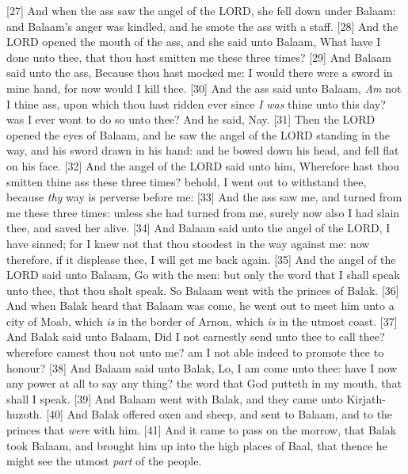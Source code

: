 [27] \textcolor[cmyk]{0.99998,1,0,0}{And when the ass saw the angel of the LORD, she fell down under Balaam: and Balaam's anger was kindled, and he smote the ass with a staff.}
[28] \textcolor[cmyk]{0.99998,1,0,0}{And the LORD opened the mouth of the ass, and she said unto Balaam, What have I done unto thee, that thou hast smitten me these three times?}
[29] \textcolor[cmyk]{0.99998,1,0,0}{And Balaam said unto the ass, Because thou hast mocked me: I would there were a sword in mine hand, for now would I kill thee.}
[30] \textcolor[cmyk]{0.99998,1,0,0}{And the ass said unto Balaam, \emph{Am} not I thine ass, upon which thou hast ridden ever since \emph{I} \emph{was} thine unto this day? was I ever wont to do so unto thee? And he said, Nay.}
[31] \textcolor[cmyk]{0.99998,1,0,0}{Then the LORD opened the eyes of Balaam, and he saw the angel of the LORD standing in the way, and his sword drawn in his hand: and he bowed down his head, and fell flat on his face.}
[32] \textcolor[cmyk]{0.99998,1,0,0}{And the angel of the LORD said unto him, Wherefore hast thou smitten thine ass these three times? behold, I went out to withstand thee, because \emph{thy} way is perverse before me:}
[33] \textcolor[cmyk]{0.99998,1,0,0}{And the ass saw me, and turned from me these three times: unless she had turned from me, surely now also I had slain thee, and saved her alive.}
[34] \textcolor[cmyk]{0.99998,1,0,0}{And Balaam said unto the angel of the LORD, I have sinned; for I knew not that thou stoodest in the way against me: now therefore, if it displease thee, I will get me back again.}
[35] \textcolor[cmyk]{0.99998,1,0,0}{And the angel of the LORD said unto Balaam, Go with the men: but only the word that I shall speak unto thee, that thou shalt speak. So Balaam went with the princes of Balak.}
[36] \textcolor[cmyk]{0.99998,1,0,0}{And when Balak heard that Balaam was come, he went out to meet him unto a city of Moab, which \emph{is} in the border of Arnon, which \emph{is} in the utmost coast.}
[37] \textcolor[cmyk]{0.99998,1,0,0}{And Balak said unto Balaam, Did I not earnestly send unto thee to call thee? wherefore camest thou not unto me? am I not able indeed to promote thee to honour?}
[38] \textcolor[cmyk]{0.99998,1,0,0}{And Balaam said unto Balak, Lo, I am come unto thee: have I now any power at all to say any thing? the word that God putteth in my mouth, that shall I speak.}
[39] \textcolor[cmyk]{0.99998,1,0,0}{And Balaam went with Balak, and they came unto Kirjath-huzoth.}
[40] \textcolor[cmyk]{0.99998,1,0,0}{And Balak offered oxen and sheep, and sent to Balaam, and to the princes that \emph{were} with him.}
[41] \textcolor[cmyk]{0.99998,1,0,0}{And it came to pass on the morrow, that Balak took Balaam, and brought him up into the high places of Baal, that thence he might see the utmost \emph{part} of the people.}